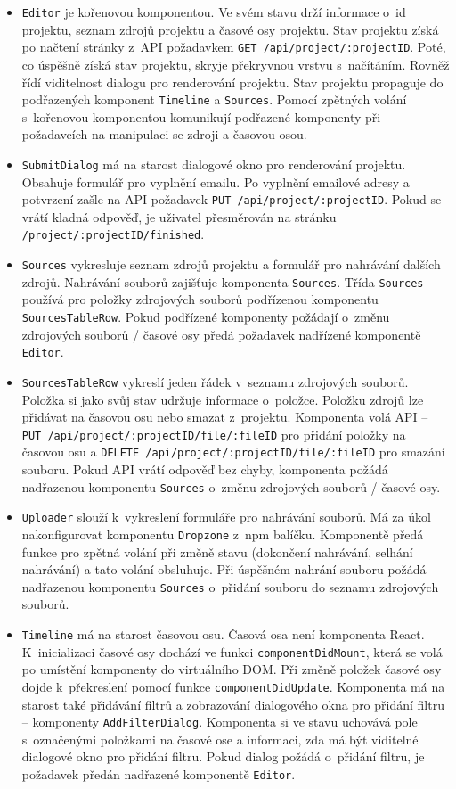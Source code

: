 \begin{itemize}
\item \texttt{Editor} je kořenovou komponentou.  Ve svém stavu drží informace o~id projektu, seznam zdrojů projektu a časové osy projektu. Stav projektu získá po načtení stránky z~API požadavkem \texttt{GET /api/project/:projectID}. Poté, co úspěšně získá stav projektu, skryje překryvnou vrstvu s~načítáním. Rovněž řídí viditelnost dialogu pro renderování projektu. Stav projektu propaguje do podřazených komponent \texttt{Timeline} a \texttt{Sources}. Pomocí zpětných volání s~kořenovou komponentou komunikují podřazené komponenty při požadavcích na manipulaci se zdroji a časovou osou.
\item \texttt{SubmitDialog} má na starost dialogové okno pro renderování projektu. Obsahuje formulář pro vyplnění emailu. Po vyplnění emailové adresy a potvrzení zašle na API požadavek \texttt{PUT /api/project/:projectID}. Pokud se vrátí kladná odpověď, je uživatel přesměrován na stránku \texttt{/project/:projectID/finished}.
\item \texttt{Sources} vykresluje seznam zdrojů projektu a formulář pro nahrávání dalších zdrojů. Nahrávání souborů zajišťuje komponenta \texttt{Sources}. Třída \texttt{Sources} používá pro položky zdrojových souborů podřízenou komponentu \texttt{SourcesTableRow}. Pokud podřízené komponenty požádají o~změnu zdrojových souborů / časové osy předá požadavek nadřízené komponentě \texttt{Editor}.
\item \texttt{SourcesTableRow} vykreslí jeden řádek v~seznamu zdrojových souborů. Položka si jako svůj stav udržuje informace o~položce. Položku zdrojů lze přidávat na časovou osu nebo smazat z~projektu. Komponenta volá API -- \texttt{PUT /api/project/:projectID/file/:fileID} pro přidání položky na časovou osu a \texttt{DELETE /api/project/:projectID/file/:fileID} pro smazání souboru. Pokud API vrátí odpověď bez chyby, komponenta požádá nadřazenou komponentu \texttt{Sources} o~změnu zdrojových souborů / časové osy.
\item \texttt{Uploader} slouží k~vykreslení formuláře pro nahrávání souborů. Má za úkol nakonfigurovat komponentu \texttt{Dropzone} z~npm balíčku. Komponentě předá funkce pro zpětná volání při změně stavu (dokončení nahrávání, selhání nahrávání) a tato volání obsluhuje. Při úspěšném nahrání souboru požádá nadřazenou komponentu \texttt{Sources} o~přidání souboru do seznamu zdrojových souborů.
\item \texttt{Timeline} má na starost časovou osu. Časová osa není komponenta React. K~inicializaci časové osy dochází ve funkci \texttt{componentDidMount}, která se volá po umístění komponenty do virtuálního DOM. Při změně položek časové osy dojde k~překreslení pomocí funkce \texttt{componentDidUpdate}. Komponenta má na starost také přidávání filtrů a zobrazování dialogového okna pro přidání filtru -- komponenty \texttt{AddFilterDialog}. Komponenta si ve stavu uchovává pole s~označenými položkami na časové ose a informaci, zda má být viditelné dialogové okno pro přidání filtru. Pokud dialog požádá o~přidání filtru, je požadavek předán nadřazené komponentě \texttt{Editor}.

\end{itemize}
